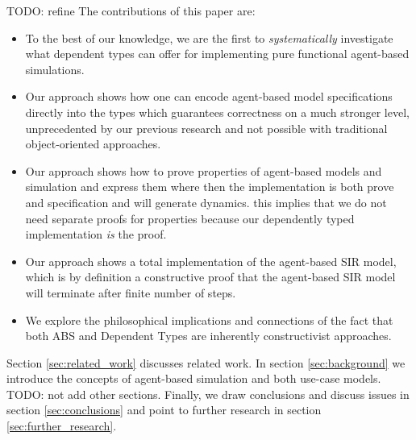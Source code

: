 TODO: refine
The contributions of this paper are:
\begin{itemize}
	\item To the best of our knowledge, we are the first to \textit{systematically} investigate what dependent types can offer for implementing pure functional agent-based simulations.
	\item Our approach shows how one can encode agent-based model specifications directly into the types which guarantees correctness on a much stronger level, unprecedented by our previous research and not possible with traditional object-oriented approaches.
	\item Our approach shows how to prove properties of agent-based models and simulation and express them where then the implementation is both prove and specification and will generate dynamics. this implies that we do not need separate proofs for properties because our dependently typed implementation \textit{is} the proof.
	\item Our approach shows a total implementation of the agent-based SIR model, which is by definition a constructive proof that the agent-based SIR model will terminate after finite number of steps.
	\item We explore the philosophical implications and connections of the fact that both ABS and Dependent Types are inherently constructivist approaches. 
\end{itemize}

Section \ref{sec:related_work} discusses related work. In section \ref{sec:background} we introduce the concepts of agent-based simulation and both use-case models. TODO: not add other sections. Finally, we draw conclusions and discuss issues in section \ref{sec:conclusions} and point to further research in section \ref{sec:further_research}.